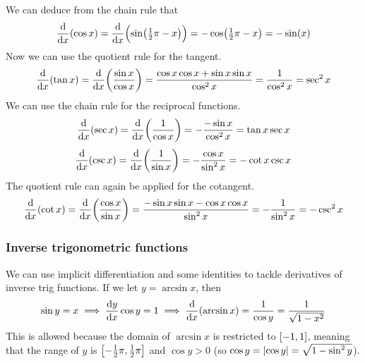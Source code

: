 \documentclass[fleqn,a4paper,11pt]{article}
\begin{document}
    We can deduce from the chain rule that
    \begin{equation*}
    \dv{x}(\cos x) = \dv{x}(\sin(\tfrac 12 \pi - x))
        = -\cos(\tfrac 12 \pi - x) = -\sin(x)
    \end{equation*}
    Now we can use the quotient rule for the tangent.
    \begin{equation*}
    \dv{x}(\tan x) = \dv{x}(\frac{\sin x}{\cos x})
        = \frac{\cos x \cos x + \sin x \sin x}{\cos^2 x}
        = \frac 1{\cos^2 x} = \sec^2 x
    \end{equation*}
    We can use the chain rule for the reciprocal functions.
    \begin{equation*}
    \dv{x}(\sec x) = \dv{x}(\frac 1{\cos x}) = -\frac{-\sin x}{\cos^2 x}
        = \tan x \sec x
    \end{equation*}
    \begin{equation*}
    \dv{x}(\csc x) = \dv{x}(\frac 1{\sin x}) = -\frac{\cos x}{\sin^2 x}
        = -\cot x \csc x
    \end{equation*}
    The quotient rule can again be applied for the cotangent.
    \begin{equation*}
    \dv{x}(\cot x) = \dv{x}(\frac{\cos x}{\sin x})
        = \frac{-\sin x \sin x - \cos x \cos x}{\sin^2 x}
        = -\frac 1{\sin^2 x} = -\csc^2 x
    \end{equation*}

    \subsubsection{Inverse trigonometric functions} \label{sec_calc_trig_inv}

    We can use implicit differentiation and some identities to tackle
    derivatives of inverse trig functions. If we let \(y = \arcsin x\), then
    \begin{equation*}
    \sin y = x \implies \dv{y}{x} \cos y = 1
        \implies \dv{x}(\arcsin x) = \frac{1}{\cos y} = \frac{1}{\sqrt{1 - x^2}}
    \end{equation*}
    This is allowed because the domain of \(\arcsin x\) is restricted to
    \(\intcc{-1, 1}\), meaning that the range of \(y\) is
    \(\intcc{-\frac 12 \pi, \frac 12 \pi}\) and \(\cos y > 0\)
    (so \(\cos y = \abs{\cos y} = \sqrt{1 - \sin^2 y}\)).
\end{document}

